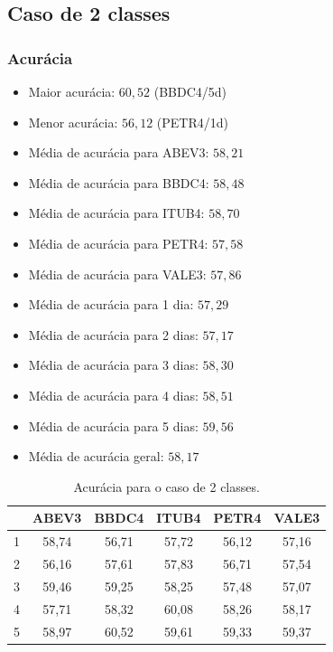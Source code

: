 \documentclass[grad,numbers]{coppe}
\begin{document}
			\subsection{Caso de 2 classes}
				\subsubsection{Acurácia}
					\begin{itemize}
		 				\item Maior acurácia: $60,52$ (BBDC4/5d)
		 				\item Menor acurácia: $56,12$ (PETR4/1d)
		 				\item Média de acurácia para ABEV3: $58,21$
		 				\item Média de acurácia para BBDC4: $58,48$
		 				\item Média de acurácia para ITUB4: $58,70$
		 				\item Média de acurácia para PETR4: $57,58$
		 				\item Média de acurácia para VALE3: $57,86$
		 				\item Média de acurácia para 1 dia: $57,29$
		 				\item Média de acurácia para 2 dias: $57,17$
		 				\item Média de acurácia para 3 dias: $58,30$
		 				\item Média de acurácia para 4 dias: $58,51$
		 				\item Média de acurácia para 5 dias: $59,56$
		 				\item Média de acurácia geral: $58,17$
		 			\end{itemize}
		 			\begin{table}[h]
		 				\caption{Acurácia para o caso de 2 classes.}
		 				\label{tab:2c_ac_analysis}
		 				\centering
		 				{\footnotesize
		 					\begin{tabular}{|c|c|c|c|c|c|}
		 						\hline
		 						\diagbox[linewidth=0.2pt, width=\dimexpr \textwidth/10+2\tabcolsep\relax, height=0.8cm]{Dias}{Ativo}
		 						& ABEV3 & BBDC4 & ITUB4 & PETR4 & VALE3\\
		 						\hline
		 						1 & 58,74 & 56,71 & 57,72 & 56,12 & 57,16 \\
		 						2 & 56,16 & 57,61 & 57,83 & 56,71 & 57,54 \\
		 						3 & 59,46 & 59,25 & 58,25 & 57,48 & 57,07 \\
		 						4 & 57,71 & 58,32 & 60,08 & 58,26 & 58,17 \\
		 						5 & 58,97 & 60,52 & 59,61 & 59,33 & 59,37 \\
		 						\hline
		 				\end{tabular}}
		 			\end{table}
	 			\newpage
\end{document}
